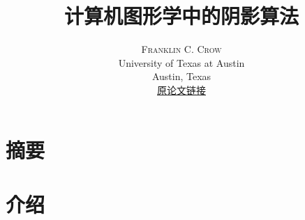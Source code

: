 \documentclass[a4paper, twocolumn]{article}
\title{计算机图形学中的阴影算法} %
\author{%
	\textsc{Franklin C. Crow} \\[1ex] %
	\normalsize University of Texas at Austin \\ %
	\normalsize Austin, Texas \\ %
	\normalsize \href{http://dl.acm.org/citation.cfm?id=563901}{原论文链接}
}
\date{} %
\begin{document}
\begin{CJK}{UTF8}{gbsn}
	\maketitle
	
	
	\section{摘要}
	
	\section{介绍}
	
	\renewcommand{\refname}{参考文献}
	\begin{thebibliography}{99} %
		
%		
		
	\end{thebibliography}
	
\end{CJK}	
\end{document}
